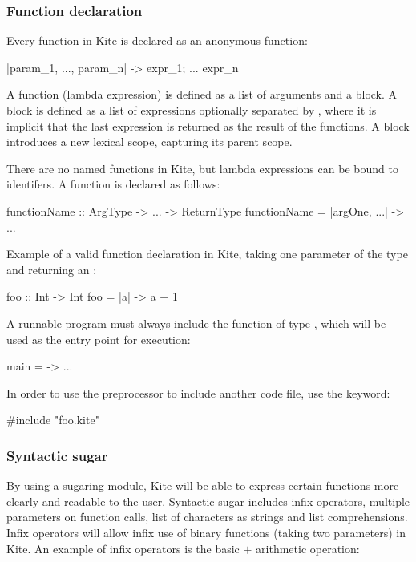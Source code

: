 \subsubsection{Function declaration}
Every function in Kite is declared as an anonymous function:

\begin{kite}
|param_1, ..., param_n| -> {
  expr_1;
  ...
  expr_n
}
\end{kite}

A function (lambda expression) is defined as a list of arguments and a block. A block is defined as a list of expressions optionally separated by \code{;}, where it is implicit that the last expression is returned as the result of the functions. A block introduces a new lexical scope, capturing its parent scope.

There are no named functions in Kite, but lambda expressions can be bound to identifers. A function is declared as follows:

\begin{kite}
functionName :: ArgType -> ... -> ReturnType
functionName = |argOne, ...| -> { ... }
\end{kite}

Example of a valid function declaration in Kite, taking one parameter of the type  and returning an :

\begin{kite}
foo :: Int -> Int
foo = |a| -> {
  a + 1
}
\end{kite}

A runnable program must always include the  function of type , which will be used as the entry point for execution:

\begin{kite}
main = -> { ... }
\end{kite}

In order to use the preprocessor to include another code file, use the  keyword:
\begin{kite}
#include "foo.kite"
\end{kite}

\subsubsection{Syntactic sugar}
\label{sec:kite-design-sugar}
By using a sugaring module, Kite will be able to express certain functions more clearly and readable to the user. Syntactic sugar includes infix operators, multiple parameters on function calls, list of characters as strings and list comprehensions. Infix operators will allow infix use of binary functions (taking two parameters) in Kite. An example of infix operators is the basic $+$ arithmetic operation:


